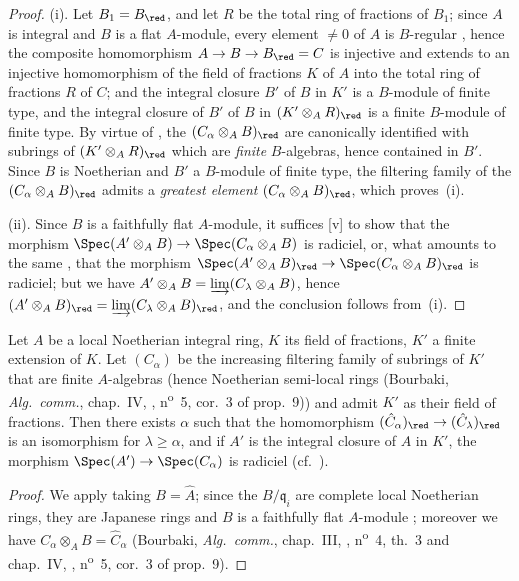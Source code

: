 \begin{proof}
\medskip\noindent
(i).
Let $B_1=B_\red$, and let $R$ be the total ring of fractions of $B_1$; since $A$ is integral and $B$ is a flat $A$-module, every element $\neq 0$ of $A$ is $B$-regular , hence the composite homomorphism $A\to B\to B_\red=C$ is injective and extends to an injective homomorphism of the field of fractions $K$ of $A$ into the total ring of fractions $R$ of $C$; and the integral closure $B'$ of $B$ in $K'$ is a $B$-module of finite type, and the integral closure of $B'$ of $B$ in $(K'\otimes_A R)_\red$ is a finite $B$-module of finite type.
By virtue of , the $(C_\alpha\otimes_A B)_\red$ are canonically identified with subrings of $(K'\otimes_A R)_\red$ which are \emph{finite} $B$-algebras, hence contained in $B'$.
Since $B$ is Noetherian and $B'$ a $B$-module of finite type, the filtering family of the $(C_\alpha\otimes_A B)_\red$ admits a \emph{greatest element} $(C_\alpha\otimes_A B)_\red$, which proves~(i).

\medskip\noindent
(ii).
Since $B$ is a faithfully flat $A$-module, it suffices [v] to show that the morphism $\Spec(A'\otimes_A B)\to\Spec(C_\alpha\otimes_A B)$ is radiciel, or, what amounts to the same , that the morphism $\Spec(A'\otimes_A B)_\red\to\Spec(C_\alpha\otimes_A B)_\red$ is radiciel; but we have $A'\otimes_A B=\varinjlim(C_\lambda\otimes_A B)$, hence  $(A'\otimes_A B)_\red=\varinjlim(C_\lambda\otimes_A B)_\red$, and the conclusion follows from~(i).
\end{proof}

\begin{corollary}[23.2.5]
\label{0.23.2.5}
Let $A$ be a local Noetherian integral ring, $K$ its field of fractions, $K'$ a finite extension of $K$.
Let $(C_\alpha)$ be the increasing filtering family of subrings of $K'$ that are finite $A$-algebras (hence Noetherian semi-local rings \textnormal{(Bourbaki, \emph{Alg.~comm.}, chap.~IV, , n\textsuperscript{o}~5, cor.~3 of prop.~9)}) and admit $K'$ as their field of fractions.
Then there exists $\alpha$ such that the homomorphism $(\hat{C}_\alpha)_\red\to(\hat{C}_\lambda)_\red$ is an isomorphism for $\lambda\geq\alpha$, and if $A'$ is the integral closure of $A$ in $K'$, the morphism $\Spec(A')\to\Spec(C_\alpha)$ is radiciel \textnormal{(cf.~)}.
\end{corollary}

\begin{proof}
We apply  taking $B=\hat{A}$; since the $B/\mathfrak{q}_i$ are complete local Noetherian rings, they are Japanese rings  and $B$ is a faithfully flat $A$-module ; moreover we have $C_\alpha\otimes_A B=\hat{C}_\alpha$ (Bourbaki, \emph{Alg.~comm.}, chap.~III, , n\textsuperscript{o}~4, th.~3 and chap.~IV, , n\textsuperscript{o}~5, cor.~3 of prop.~9).
\end{proof}

